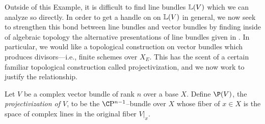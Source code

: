 Outside of this Example, it is difficult to find line bundles $\mathbb{L}(V)$ which we can analyze so directly.  In order to get a handle on on $\mathbb{L}(V)$ in general, we now seek to strengthen this bond between line bundles and vector bundles by finding inside of algebraic topology the alternative presentations of line bundles given in .  In particular, we would like a topological construction on vector bundles which produces divisors---i.e., finite schemes over $X_E$.  This has the scent of a certain familiar topological construction called projectivization, and we now work to justify the relationship.

\begin{definition}
Let $V$ be a complex vector bundle of rank $n$ over a base $X$.  Define $\P(V)$, the \textit{projectivization of $V$}, to be the $\CP^{n-1}$--bundle over $X$ whose fiber of $x \in X$ is the space of complex lines in the original fiber $V|_x$.
\end{definition}

